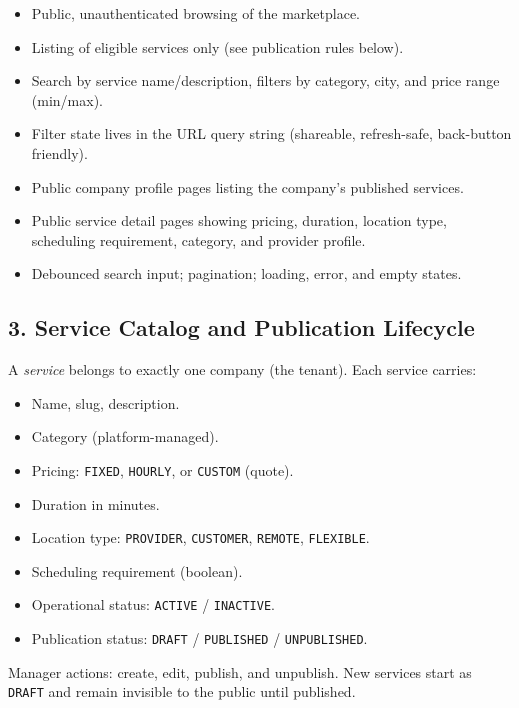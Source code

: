 \documentclass[11pt,a4paper]{article}
\begin{document}
\begin{itemize}[leftmargin=2em, itemsep=2pt]
  \item Public, unauthenticated browsing of the marketplace.
  \item Listing of eligible services only (see publication rules below).
  \item Search by service name/description, filters by category, city, and price range (min/max).
  \item Filter state lives in the URL query string (shareable, refresh-safe, back-button friendly).
  \item Public company profile pages listing the company's published services.
  \item Public service detail pages showing pricing, duration, location type, scheduling requirement, category, and provider profile.
  \item Debounced search input; pagination; loading, error, and empty states.
\end{itemize}

\subsection{3. Service Catalog and Publication Lifecycle}
\label{sec:catalog}

A \emph{service} belongs to exactly one company (the tenant). Each service carries:

\begin{itemize}[leftmargin=2em, itemsep=2pt]
  \item Name, slug, description.
  \item Category (platform-managed).
  \item Pricing: \texttt{FIXED}, \texttt{HOURLY}, or \texttt{CUSTOM} (quote).
  \item Duration in minutes.
  \item Location type: \texttt{PROVIDER}, \texttt{CUSTOMER}, \texttt{REMOTE}, \texttt{FLEXIBLE}.
  \item Scheduling requirement (boolean).
  \item Operational status: \texttt{ACTIVE} / \texttt{INACTIVE}.
  \item Publication status: \texttt{DRAFT} / \texttt{PUBLISHED} / \texttt{UNPUBLISHED}.
\end{itemize}

Manager actions: create, edit, publish, and unpublish. New services start as \texttt{DRAFT} and remain invisible to the public until published.
\end{document}
